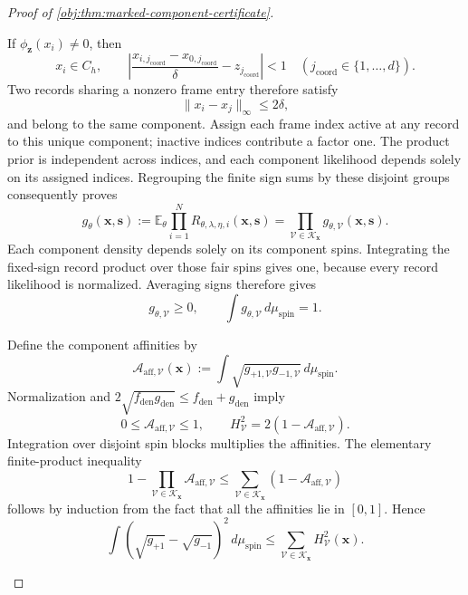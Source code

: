 \documentclass[11pt]{article}
\begin{document}
\begin{proof}[Proof of \cref{obj:thm:marked-component-certificate}]
\begin{enumerate}
If \(\phi_{\mathbf z}(x_i)\ne0\), then
\[
x_i\in C_h,
\qquad
\left|\frac{x_{i,j_{\mathrm{coord}}}-x_{0,j_{\mathrm{coord}}}}{\delta}-z_{j_{\mathrm{coord}}}\right|<1
\quad(j_{\mathrm{coord}}\in\{1,\ldots,d\}).
\]
Two records sharing a nonzero frame entry therefore satisfy
\[
\|x_i-x_j\|_\infty\le2\delta,
\]
and belong to the same component. Assign each frame index active at any record to this unique component; inactive indices contribute a factor one. The product prior is independent across indices, and each component likelihood depends solely on its assigned indices. Regrouping the finite sign sums by these disjoint groups consequently proves
\[
g_\theta(\mathbf x,\mathbf s)
:=
\mathbb E_\theta
\prod_{i=1}^{N}R_{\theta,\lambda,\eta,i}(\mathbf x,\mathbf s)
=
\prod_{\mathcal V\in\mathscr K_{\mathbf x}}
g_{\theta,\mathcal V}(\mathbf x,\mathbf s).
\]
Each component density depends solely on its component spins. Integrating the fixed-sign record product over those fair spins gives one, because every record likelihood is normalized. Averaging signs therefore gives
\[
g_{\theta,\mathcal V}\ge0,
\qquad
\int g_{\theta,\mathcal V}\,d\mu_{\mathrm{spin}}=1.
\]

Define the component affinities by
\[
\mathcal A_{\mathrm{aff},\mathcal V}(\mathbf x)
:=
\int\sqrt{g_{+1,\mathcal V}g_{-1,\mathcal V}}\,
d\mu_{\mathrm{spin}}.
\]
Normalization and \(2\sqrt{f_{\mathrm{den}}g_{\mathrm{den}}}
\le f_{\mathrm{den}}+g_{\mathrm{den}}\) imply
\[
0\le\mathcal A_{\mathrm{aff},\mathcal V}\le1,
\qquad
H_{\mathcal V}^2
=2(1-\mathcal A_{\mathrm{aff},\mathcal V}).
\]
Integration over disjoint spin blocks multiplies the affinities. The elementary finite-product inequality
\[
1-\prod_{\mathcal V\in\mathscr K_{\mathbf x}}
\mathcal A_{\mathrm{aff},\mathcal V}
\le
\sum_{\mathcal V\in\mathscr K_{\mathbf x}}
(1-\mathcal A_{\mathrm{aff},\mathcal V})
\]
follows by induction from the fact that all the affinities lie in \([0,1]\). Hence
\[
\int(\sqrt{g_{+1}}-\sqrt{g_{-1}})^2\,d\mu_{\mathrm{spin}}
\le
\sum_{\mathcal V\in\mathscr K_{\mathbf x}}
H_{\mathcal V}^2(\mathbf x).
\]


\end{enumerate}
\end{proof}
\end{document}
